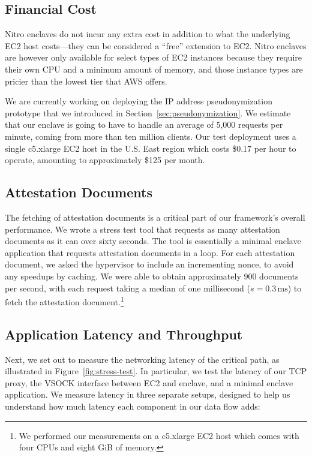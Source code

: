 \subsection{Financial Cost}
\label{sec:cost}

Nitro enclaves do not incur any extra cost in addition to what the underlying
EC2 host costs---they can be considered a ``free'' extension to EC2.  Nitro
enclaves are however only available for select types of EC2 instances because
they require their own CPU and a minimum amount of memory, and those instance
types are pricier than the lowest tier that AWS offers.

We are currently working on deploying the IP address pseudonymization prototype
that we introduced in Section~\ref{sec:pseudonymization}.  We estimate that our
enclave is going to have to handle an average of 5,000 requests per minute,
coming from more than ten million clients.  Our test deployment uses a single
c5.xlarge EC2 host in the U.S. East region which costs \$0.17 per hour to
operate, amounting to approximately \$125 per month.

\subsection{Attestation Documents}
\label{sec:attestation-performance}

The fetching of attestation documents is a critical part of our framework's
overall performance.  We wrote a stress test tool that requests as many
attestation documents as it can over sixty seconds.  The tool is essentially a
minimal enclave application that requests attestation documents in a loop.  For
each attestation document, we asked the hypervisor to include an incrementing
nonce, to avoid any speedups by caching.  We were able to obtain approximately
900 documents per second, with each request taking a median of one millisecond
($s = 0.3\,\text{ms}$) to fetch the attestation document.\footnote{We performed
our measurements on a c5.xlarge EC2 host which comes with four CPUs and eight
GiB of memory.}

\subsection{Application Latency and Throughput}
\label{sec:end-to-end}

Next, we set out to measure the networking latency of the critical path, as
illustrated in Figure~\ref{fig:stress-test}.  In particular, we test the
latency of our TCP proxy, the VSOCK interface between EC2 and enclave, and a
minimal enclave application.
%
We measure latency in three separate setups, designed to help us understand how
much latency each component in our data flow adds:

